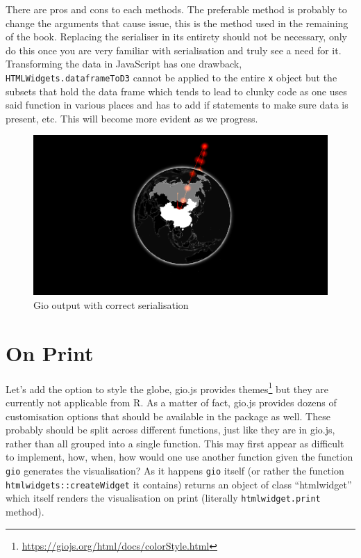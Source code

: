 \documentclass[
]{krantz}
\renewcommand{\href}[2]{#2\footnote{\url{#1}}}
\begin{document}
There are pros and cons to each methods. The preferable method is probably to change the arguments that cause issue, this is the method used in the remaining of the book. Replacing the serialiser in its entirety should not be necessary, only do this once you are very familiar with serialisation and truly see a need for it. Transforming the data in JavaScript has one drawback, \texttt{HTMLWidgets.dataframeToD3} cannot be applied to the entire \texttt{x} object but the subsets that hold the data frame which tends to lead to clunky code as one uses said function in various places and has to add if statements to make sure data is present, etc. This will become more evident as we progress.

\begin{figure}
\centering
\includegraphics{images/gio-data.png}
\caption{Gio output with correct serialisation}
\end{figure}

\hypertarget{on-print}{%
\section*{On Print}\label{on-print}}


Let's add the option to style the globe, gio.js provides \href{https://giojs.org/html/docs/colorStyle.html}{themes} but they are currently not applicable from R. As a matter of fact, gio.js provides dozens of customisation options that should be available in the package as well. These probably should be split across different functions, just like they are in gio.js, rather than all grouped into a single function. This may first appear as difficult to implement, how, when, how would one use another function given the function \texttt{gio} generates the visualisation? As it happens \texttt{gio} itself (or rather the function \texttt{htmlwidgets::createWidget} it contains) returns an object of class ``htmlwidget'' which itself renders the visualisation on print (literally \texttt{htmlwidget.print} method).
\end{document}
